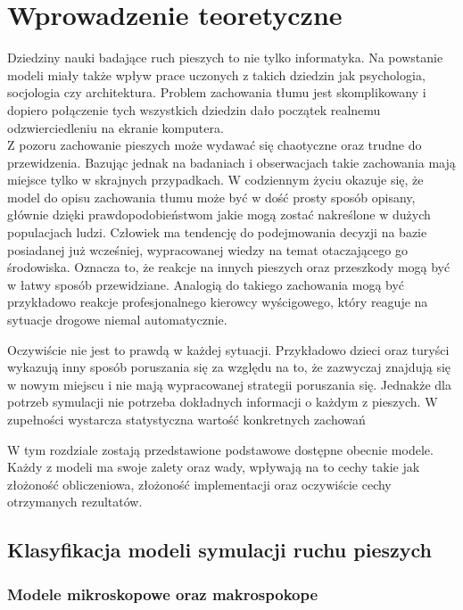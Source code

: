 \chapter{Wprowadzenie teoretyczne}
\label{cha:wprowadzenieTeoretyczne}

Dziedziny nauki badające ruch pieszych to nie tylko informatyka. Na powstanie modeli miały także wpływ prace uczonych z takich dziedzin jak psychologia, socjologia czy architektura. Problem zachowania tłumu jest skomplikowany i dopiero połączenie tych wszystkich dziedzin dało początek realnemu odzwierciedleniu na ekranie komputera. \\
Z pozoru zachowanie pieszych może wydawać się chaotyczne oraz trudne do przewidzenia. Bazując jednak na badaniach i obserwacjach takie zachowania mają miejsce tylko w skrajnych przypadkach. W codziennym życiu okazuje się, że model do opisu zachowania tłumu może być w dość prosty sposób opisany, głównie dzięki prawdopodobieństwom jakie mogą zostać nakreślone w dużych populacjach ludzi. Człowiek ma tendencję do podejmowania decyzji na bazie posiadanej już wcześniej, wypracowanej wiedzy na temat otaczającego go środowiska. Oznacza to, że reakcje na innych pieszych oraz przeszkody mogą być w łatwy sposób przewidziane. Analogią do takiego zachowania mogą być przykładowo reakcje profesjonalnego kierowcy wyścigowego, który reaguje na sytuacje drogowe niemal automatycznie.

Oczywiście nie jest to prawdą w każdej sytuacji. Przykładowo dzieci oraz turyści wykazują inny sposób poruszania się za względu na to, że zazwyczaj znajdują się w nowym miejscu i nie mają wypracowanej strategii poruszania się. Jednakże dla potrzeb symulacji nie potrzeba dokładnych informacji o każdym z pieszych. W zupełności wystarcza statystyczna wartość konkretnych zachowań

W tym rozdziale zostają przedstawione podstawowe dostępne obecnie modele. Każdy z modeli ma swoje zalety oraz wady, wpływają na to cechy takie jak złożoność obliczeniowa, złożoność implementacji oraz oczywiście cechy otrzymanych rezultatów.

\section{Klasyfikacja modeli symulacji ruchu pieszych}
\label{sec:klasyfikacja}

\subsection{Modele mikroskopowe oraz makrospokope}

